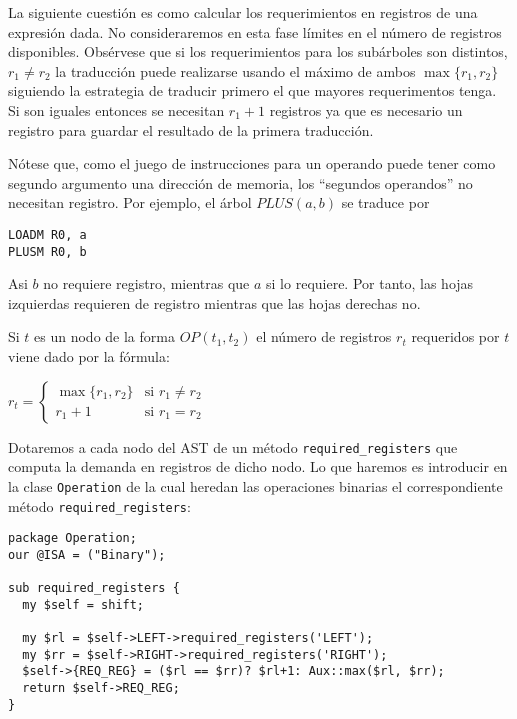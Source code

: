 La siguiente cuestión es como calcular los requerimientos en registros
de una expresión dada. No consideraremos en esta fase límites en el número de 
registros disponibles. Obsérvese que si los requerimientos para los subárboles
son distintos, $r_1 \neq r_2$ la traducción puede realizarse usando 
el máximo de ambos $\max\{r_1, r_2\}$ siguiendo la estrategia 
de traducir primero el que mayores requerimentos tenga. 
Si son iguales entonces se necesitan $r_1 + 1$
registros ya que es necesario un registro para guardar el resultado de
la primera traducción. 

Nótese que, como el juego de instrucciones
para un operando  puede tener como segundo argumento una dirección de memoria,
los ``segundos operandos'' no necesitan registro. Por ejemplo, 
el árbol  $PLUS(a,b)$ se traduce por 

\begin{verbatim}
LOADM R0, a
PLUSM R0, b
\end{verbatim}

Asi $b$ no requiere registro, mientras que $a$ si lo requiere. Por tanto, las 
hojas izquierdas requieren de registro mientras que las hojas derechas no.

Si $t$ es un nodo de la forma
$OP(t_1, t_2)$ el número de registros $r_t$ requeridos por $t$ viene dado por 
la fórmula:

\vspace{0.25cm}
\begin{center}
$r_t =  \left \{ \begin{array}{ll}
               \max\{r_1, r_2\} & \mbox{si $r_1 \neq r_2$}\\
               r_1 + 1 & \mbox{si $r_1 = r_2$} 
           \end{array}
        \right .$ 
\end{center}
\vspace{0.25cm}

Dotaremos a cada nodo del AST de un método \verb|required_registers|
que computa la demanda en registros de dicho nodo. 
Lo que haremos es introducir en la clase \verb|Operation| de la cual heredan
las operaciones binarias el correspondiente método \verb|required_registers|:

\begin{verbatim}
package Operation;
our @ISA = ("Binary");

sub required_registers {
  my $self = shift;

  my $rl = $self->LEFT->required_registers('LEFT');
  my $rr = $self->RIGHT->required_registers('RIGHT');
  $self->{REQ_REG} = ($rl == $rr)? $rl+1: Aux::max($rl, $rr);
  return $self->REQ_REG;
}
\end{verbatim}

